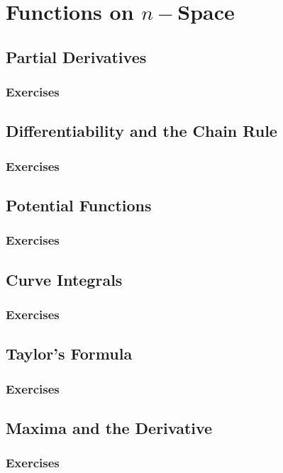 \setcounter{chapter}{0}
\renewcommand{\thechapter}{15}
\chapter{Functions on $n-$Space}\label{ch:15}
\setcounter{equation}{0}	        %

\section{Partial Derivatives}\label{sec:15.1}
\subsection*{Exercises}\label{sec:15.1_Exercises}
\section{Differentiability and the Chain Rule}\label{sec:15.2}	
\subsection*{Exercises}\label{sec:15.2_Exercises}
\section{Potential Functions}\label{sec:15.3}	
\subsection*{Exercises}\label{sec:15.3_Exercises}
\section{Curve Integrals}\label{sec:15.4}	
\subsection*{Exercises}\label{sec:15.4_Exercises}
\section{Taylor's Formula}\label{sec:15.5}	
\subsection*{Exercises}\label{sec:15.5_Exercises}
\section{Maxima and the Derivative}\label{sec:15.6}	
\subsection*{Exercises}\label{sec:15.6_Exercises}
